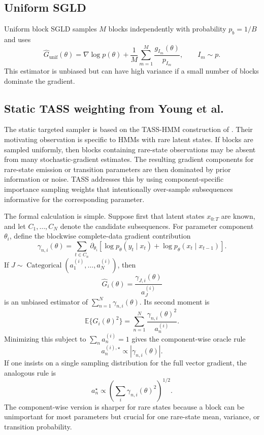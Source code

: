 \documentclass{article}
\newcommand{\E}{\mathbb{E}}
\newcommand{\1}{\mathbf{1}}
\begin{document}
\subsection{Uniform SGLD}

Uniform block SGLD samples $M$ blocks independently with probability $p_b=1/B$ and uses
\[
  \widehat G_{\mathrm{unif}}(\theta)
  =
  \nabla \log p(\theta)
  + \frac{1}{M}\sum_{m=1}^M \frac{g_{I_m}(\theta)}{p_{I_m}},
  \qquad I_m \sim p.
\]
This estimator is unbiased but can have high variance if a small number of blocks dominate the gradient.

\subsection{Static TASS weighting from Young et al.}

The static targeted sampler is based on the TASS-HMM construction of \citet{ou2024tass}. Their motivating observation is specific to HMMs with rare latent states. If blocks are sampled uniformly, then blocks containing rare-state observations may be absent from many stochastic-gradient estimates. The resulting gradient components for rare-state emission or transition parameters are then dominated by prior information or noise. TASS addresses this by using component-specific importance sampling weights that intentionally over-sample subsequences informative for the corresponding parameter.

The formal calculation is simple. Suppose first that latent states $x_{0:T}$ are known, and let $C_1,\dots,C_N$ denote the candidate subsequences. For parameter component $\theta_i$, define the blockwise complete-data gradient contribution
\[
  \gamma_{n,i}(\theta)
  =
  \sum_{t\in C_n}
  \partial_{\theta_i}
  \left[
    \log p_\theta(y_t\mid x_t)
    +
    \log p_\theta(x_t\mid x_{t-1})
  \right].
\]
If $J\sim \operatorname{Categorical}(a^{(i)}_1,\dots,a^{(i)}_N)$, then
\[
  \widehat G_i(\theta)
  =
  \frac{\gamma_{J,i}(\theta)}{a_J^{(i)}}
\]
is an unbiased estimator of $\sum_{n=1}^N \gamma_{n,i}(\theta)$. Its second moment is
\[
  \E\{\widehat G_i(\theta)^2\}
  =
  \sum_{n=1}^N
  \frac{\gamma_{n,i}(\theta)^2}{a_n^{(i)}}.
\]
Minimizing this subject to $\sum_n a_n^{(i)}=1$ gives the component-wise oracle rule
\begin{equation}
  a_n^{(i),\star}
  \propto
  |\gamma_{n,i}(\theta)|.
  \label{eq:tass-component}
\end{equation}
If one insists on a single sampling distribution for the full vector gradient, the analogous rule is
\[
  a_n^\star \propto \left(\sum_i \gamma_{n,i}(\theta)^2\right)^{1/2}.
\]
The component-wise version is sharper for rare states because a block can be unimportant for most parameters but crucial for one rare-state mean, variance, or transition probability.
\end{document}
